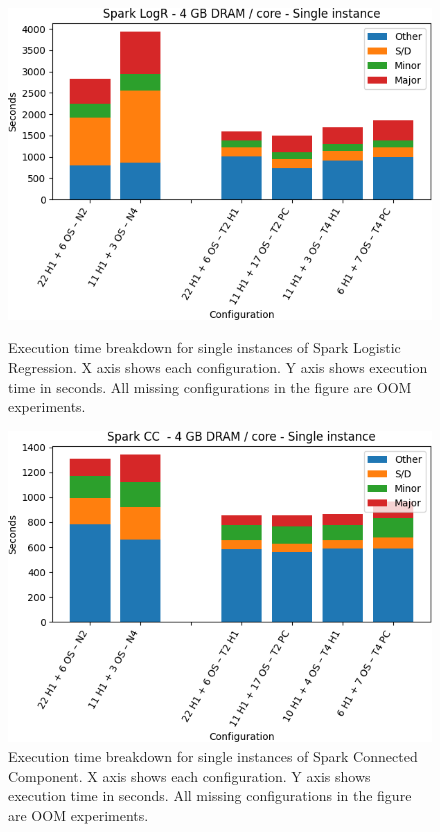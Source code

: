 \begin{figure}[thbp]
        \centering
    \includegraphics[width=\linewidth]{./fig/logr64_single.png}
    \caption{Execution time breakdown for single instances of Spark
    Logistic Regression. X axis shows each configuration. Y axis shows execution time in seconds. All missing configurations in the figure are OOM experiments.}
    \label{fig:logr64_single}

    \includegraphics[width=\linewidth]{./fig/cc64_single.png}
    \caption{Execution time breakdown for single instances of Spark
    Connected Component. X axis shows each configuration.
Y axis shows execution time in seconds. All missing configurations in the figure are OOM experiments.}
    \label{fig:cc64_single}
\end{figure}

